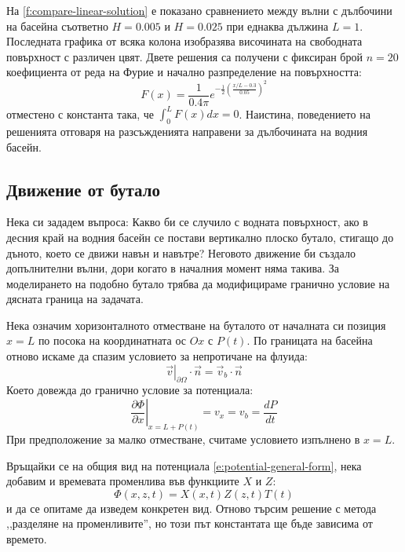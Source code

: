 \documentclass[12pt]{article}
\numberwithin{equation}{section}
\begin{document}
На \autoref{f:compare-linear-solution} е показано сравнението между вълни с дълбочини на басейна съответно $H=0.005$ и $H=0.025$ при еднаква дължина $L=1$. Последната графика от всяка колона изобразява височината на свободната повърхност с различен цвят. Двете решения са получени с фиксиран брой $n=20$ коефициента от реда на Фурие и начално разпределение на повърхността:
\begin{equation}
    F(x)=\frac{1}{0.4\pi}e^{-\frac{1}{2}\left(\frac{x/L-0.3}{0.05}\right)^2}
\end{equation}
отместено с константа така, че $\int_0^L F(x)dx = 0$.
Наистина, поведението на решенията отговаря на разсъжденията направени за дълбочината на водния басейн.

\subsection{Движение от бутало}
Нека си зададем въпроса: Какво би се случило с водната повърхност, ако в десния край на водния басейн се постави вертикално плоско бутало, стигащо до дъното, което се движи навън и навътре? Неговото движение би създало допълнителни вълни, дори когато в началния момент няма такива. За моделирането на подобно бутало трябва да модифицираме гранично условие на дясната граница на задачата. 

Нека означим хоризонталното отместване на буталото от началната си позиция $x=L$ по посока на координатната ос $Ox$ с $P(t)$. По границата на басейна отново искаме да спазим условието за непротичане на флуида:
\begin{equation}
    \left. \vec{v} \right|_{\partial\Omega}\cdot\vec{n} = \vec{v}_b\cdot\vec{n}
\end{equation}
Което довежда до гранично условие за потенциала:
\begin{equation}
    \left. \frac{\partial\Phi}{\partial x} \right|_{x=L+P(t)}
    = v_x = v_b
    = \frac{d P}{d t}
\end{equation}
При предположение за малко отместване, считаме условието изпълнено в $x=L$.

Връщайки се на общия вид на потенциала \autoref{e:potential-general-form}, нека добавим и времевата променлива във функциите $X$ и $Z$:
\begin{equation}
    \Phi(x,z,t) = X(x,t)Z(z,t)T(t)
\end{equation}
и да се опитаме да изведем конкретен вид. Отново търсим решение с метода ,,разделяне на променливите'', но този път константата ще бъде зависима от времето.
\end{document}
